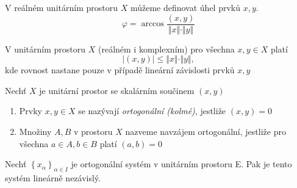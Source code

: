 \begin{notes}
	V reálném unitárním prostoru $X$ můžeme definovat úhel prvků $x,y$. \begin{equation*}
		\varphi = \arccos \frac{(x,y)}{\Vert x\Vert \cdot \Vert y \Vert }
	\end{equation*}
\end{notes}

\begin{theorem}
V unitárním prostoru $X$ (reálném i komplexním) pro všechna $x,y\in X$ platí
\begin{equation*}
	\vert (x,y)\vert \leq \Vert x\Vert \cdot \Vert y \Vert,
\end{equation*}
	kde rovnost nastane pouze v případě lineární závislosti prvků $x,y$
\end{theorem}
\begin{definition}
Nechť $X$ je unitární prostor se skalárním součinem $(x,y)$
\begin{enumerate}
	\item Prvky $x,y \in X$ se nazývají \textit{ortogonální (kolmé)}, jestliže $(x,y)=0$
	\item Množiny $A,B$ v prostoru $X$ nazveme navzájem ortogonální, jestliže pro všechna $a\in A, b\in B$ platí $(a,b)=0$
\end{enumerate} 
\end{definition}

\noindent
\begin{notes}
	Nechť $ \left\lbrace x_{\alpha} \right\rbrace_{\alpha \in I} $ je ortogonální systém v unitárním prostoru E. Pak je tento systém lineárně nezávislý.
\end{notes}

